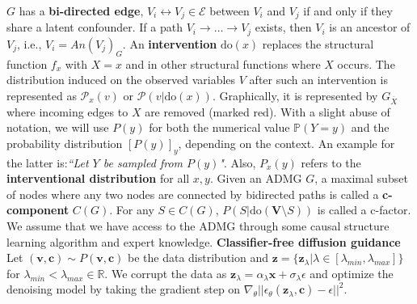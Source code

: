 \documentclass{article}
\newcommand{\x}{\mathbf{x}}
\newcommand{\V}{\mathbf{V}}
\newcommand{\vb}{\mathbf{v}}
\newcommand{\mbf}{\mathbf}
\newcommand{\Do}{\text{do}}
\theoremstyle{plain}
\theoremstyle{definition}
\newtheorem{definition}[theorem]{Definition}
\theoremstyle{remark}
\begin{document}
		$G$ has a \textbf{bi-directed edge}, $V_i  \leftrightarrow V_j \in \mathcal{E}$ between $V_i$ and $V_j$ if and only if they share a latent confounder. 
		If a path $V_i \rightarrow \hdots \rightarrow V_j$ exists,
		then $V_i$ is an ancestor of $V_j$, i.e., $V_i=An(V_j)_{G}$.
		An \textbf{intervention} $\Do(x)$ replaces the structural function $f_x$ with $X=x$ and in other structural functions where $X$ occurs. The distribution induced on the observed variables $V$ after such an intervention is represented as $\mathcal{P}_{x}({v})$ or $\mathcal{P}({v}|\Do(x))$. 
		Graphically, it is represented by $G_{\overline{X}}$ where incoming edges to $X$ are removed (marked red). 
		With a slight abuse of notation, we will use $P(y)$ for both the numerical value $\mathbb{P}(Y=y)$ and the probability distribution $[P(y)]_y$, depending on the context. An example for the latter is:\emph{``Let $Y$ be sampled from $P(y)$"}. Also, $P_x(y)$ refers to the \textbf{interventional distribution} for all $x,y$.
  Given an ADMG $G$, a maximal subset of nodes where any two nodes are connected by  bidirected paths is called a \textbf{c-component} $C(G)$. For any $S\in C(G)$, $P(S|\Do(\V\setminus S))$ is called a c-factor. We assume that we have access to the ADMG through some causal structure learning algorithm and expert knowledge.
%
%
%
%
\textbf{Classifier-free diffusion guidance~\citep{ho2021classifier}}
Let $(\vb,\mbf{c})\sim P(\vb,\mbf{c})$ be the data distribution and $\mbf{z}=\{\mbf{z}_{\lambda}| \lambda \in [\lambda_{min}, \lambda_{max}]\}$ for $\lambda_{min} < \lambda_{max} \in \mathbb{R}$. We corrupt the data as $\mbf{z}_{\lambda} = \alpha_{\lambda} \x + \sigma_{\lambda} \epsilon$ and optimize the denoising model by taking the gradient step on $\nabla_{\theta} || \epsilon_{\theta}(\mbf{z}_{\lambda},\mbf{c})-\epsilon||^2$.
\end{document}
